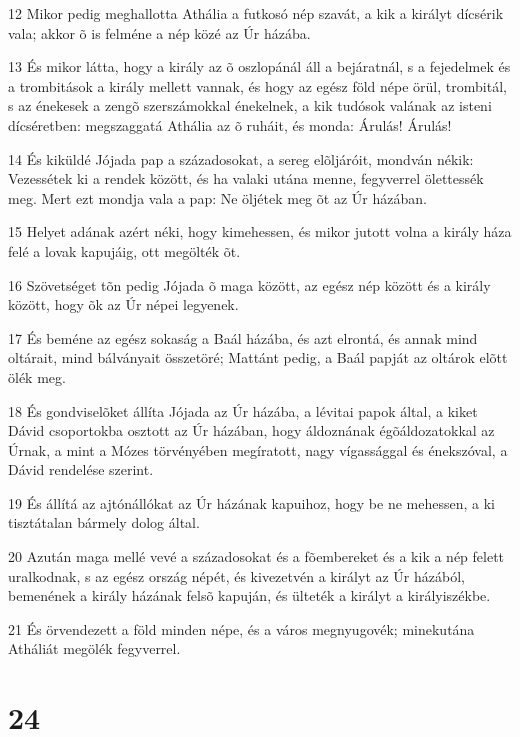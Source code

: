 \par 12 Mikor pedig meghallotta Athália a futkosó nép szavát, a kik a királyt dícsérik vala; akkor õ is felméne a nép közé az Úr házába.
\par 13 És mikor látta, hogy a király az õ oszlopánál áll a bejáratnál, s a fejedelmek és a trombitások a király mellett vannak, és hogy az egész föld népe örül, trombitál, s az énekesek a zengõ szerszámokkal énekelnek, a kik tudósok valának az isteni dícséretben: megszaggatá Athália az õ ruháit, és monda: Árulás! Árulás!
\par 14 És kiküldé Jójada pap a századosokat, a sereg elõljáróit, mondván nékik: Vezessétek ki a rendek között, és ha valaki utána menne, fegyverrel ölettessék meg. Mert ezt mondja vala a pap: Ne öljétek meg õt az Úr házában.
\par 15 Helyet adának azért néki, hogy kimehessen, és mikor jutott volna a király háza felé a lovak kapujáig, ott megölték õt.
\par 16 Szövetséget tõn pedig Jójada õ maga között, az egész nép között és a király között, hogy õk az Úr népei legyenek.
\par 17 És beméne az egész sokaság a Baál házába, és azt elrontá, és annak mind oltárait, mind bálványait összetöré; Mattánt pedig, a Baál papját az oltárok elõtt  ölék meg.
\par 18 És gondviselõket állíta Jójada az Úr házába, a lévitai papok által, a kiket Dávid csoportokba osztott az Úr házában, hogy áldoznának égõáldozatokkal az Úrnak, a mint a Mózes törvényében megíratott, nagy vígassággal és énekszóval, a Dávid rendelése szerint.
\par 19 És állítá az ajtónállókat az Úr házának kapuihoz, hogy be ne mehessen, a ki tisztátalan bármely dolog által.
\par 20 Azután maga mellé vevé a századosokat és a fõembereket és a kik a nép felett uralkodnak, s az egész ország népét, és kivezetvén a királyt az Úr házából, bemenének a király házának felsõ kapuján, és ülteték a királyt a királyiszékbe.
\par 21 És örvendezett a föld minden népe, és a város megnyugovék; minekutána Atháliát megölék fegyverrel.

\chapter{24}

